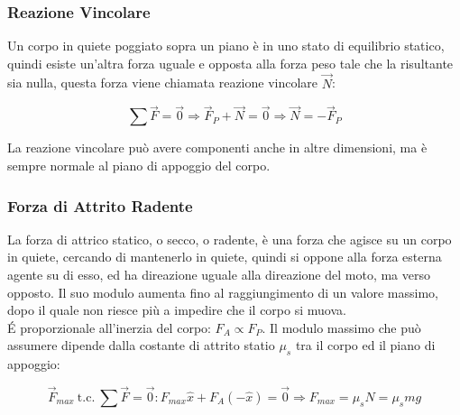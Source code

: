 \documentclass{article}
\numberwithin{equation}{subsection}
\begin{document}
\subsubsection{Reazione Vincolare}
Un corpo in quiete poggiato sopra un piano è in uno stato di 
equilibrio statico, quindi esiste un'altra forza uguale e 
opposta alla forza peso tale che la risultante sia nulla, 
questa forza viene chiamata reazione vincolare $\vec{N}$:

\begin{equation}
    \displaystyle\sum\vec{F}=\vec{0}\Rightarrow\vec{F}_P+\vec{N}=\vec{0}\Rightarrow\vec{N}=-\vec{F}_P
\end{equation}

\begin{center}\end{center}
    
La reazione vincolare può avere componenti anche in altre 
dimensioni, ma è sempre normale al piano di appoggio del corpo.

\subsubsection{Forza di Attrito Radente}
La forza di attrico statico, o secco, o radente, è una forza 
che agisce su un corpo in quiete, cercando di mantenerlo in 
quiete, quindi si oppone alla forza esterna agente su di esso, 
ed ha direazione uguale alla direazione del moto, ma verso 
opposto. Il suo modulo aumenta fino al raggiungimento di 
un valore massimo, dopo il quale non riesce più a impedire 
che il corpo si muova.\\
\'{E} proporzionale all'inerzia del corpo: $F_A\propto F_P$. Il 
modulo massimo che può assumere dipende dalla costante di attrito 
statio $\mu_s$ tra il corpo ed il piano di appoggio:

\begin{equation}
    \vec{F}_{max}\:\mbox{t.c.}\:\sum\vec{F}=\vec{0}:
    F_{max}\hat{x}+F_A(-\hat{x})=\vec{0}\Rightarrow
    F_{max}=\mu_sN=\mu_smg
\end{equation}
\end{document}
